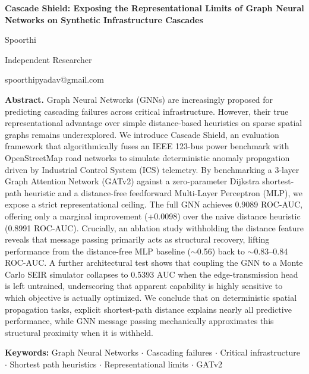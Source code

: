 \documentclass[10pt]{article}
\begin{document}
\begin{center}
{\LARGE\bfseries Cascade Shield: Exposing the Representational Limits of Graph Neural Networks on Synthetic Infrastructure Cascades}
\end{center}

\vspace{3pt}
\begin{center}
\small
Spoorthi

\vspace{2pt}
Independent Researcher

\vspace{2pt}
\ttfamily\footnotesize
spoorthipyadav@gmail.com
\end{center}

\vspace{2pt}
\noindent\textbf{Abstract.} Graph Neural Networks (GNNs) are increasingly proposed for predicting cascading failures across critical infrastructure. However, their true representational advantage over simple distance-based heuristics on sparse spatial graphs remains underexplored. We introduce Cascade Shield, an evaluation framework that algorithmically fuses an IEEE 123-bus power benchmark with OpenStreetMap road networks to simulate deterministic anomaly propagation driven by Industrial Control System (ICS) telemetry. By benchmarking a 3-layer Graph Attention Network (GATv2) against a zero-parameter Dijkstra shortest-path heuristic and a distance-free feedforward Multi-Layer Perceptron (MLP), we expose a strict representational ceiling. The full GNN achieves 0.9089 ROC-AUC, offering only a marginal improvement (+0.0098) over the naive distance heuristic (0.8991 ROC-AUC). Crucially, an ablation study withholding the distance feature reveals that message passing primarily acts as structural recovery, lifting performance from the distance-free MLP baseline ($\sim$0.56) back to $\sim$0.83--0.84 ROC-AUC. A further architectural test shows that coupling the GNN to a Monte Carlo SEIR simulator collapses to 0.5393 AUC when the edge-transmission head is left untrained, underscoring that apparent capability is highly sensitive to which objective is actually optimized. We conclude that on deterministic spatial propagation tasks, explicit shortest-path distance explains nearly all predictive performance, while GNN message passing mechanically approximates this structural proximity when it is withheld.

\textbf{Keywords:} Graph Neural Networks $\cdot$ Cascading failures $\cdot$ Critical infrastructure $\cdot$ Shortest path heuristics $\cdot$ Representational limits $\cdot$ GATv2
\end{document}
